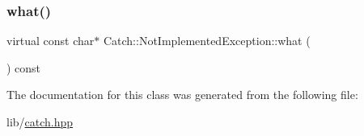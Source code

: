 \subsubsection{\texorpdfstring{what()}{what()}}
{\footnotesize\ttfamily virtual const char$\ast$ Catch\+::\+Not\+Implemented\+Exception\+::what (\begin{DoxyParamCaption}{ }\end{DoxyParamCaption}) const\hspace{0.3cm}{\ttfamily [virtual]}}



The documentation for this class was generated from the following file\+:\begin{DoxyCompactItemize}
\item 
lib/\hyperlink{catch_8hpp}{catch.\+hpp}\end{DoxyCompactItemize}
